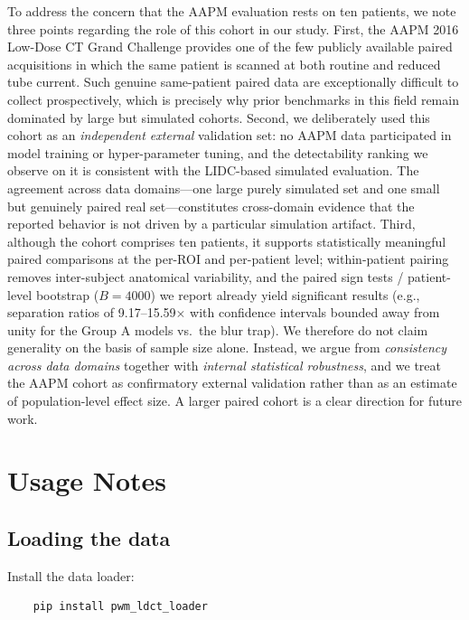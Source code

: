 \documentclass[twoside,11pt]{article}
\begin{document}
To address the concern that the AAPM evaluation rests on ten patients, we note three points regarding the role of this cohort in our study. First, the AAPM 2016 Low-Dose CT Grand Challenge provides one of the few publicly available paired acquisitions in which the same patient is scanned at both routine and reduced tube current. Such genuine same-patient paired data are exceptionally difficult to collect prospectively, which is precisely why prior benchmarks in this field remain dominated by large but simulated cohorts. Second, we deliberately used this cohort as an \emph{independent external} validation set: no AAPM data participated in model training or hyper-parameter tuning, and the detectability ranking we observe on it is consistent with the LIDC-based simulated evaluation. The agreement across data domains---one large purely simulated set and one small but genuinely paired real set---constitutes cross-domain evidence that the reported behavior is not driven by a particular simulation artifact. Third, although the cohort comprises ten patients, it supports statistically meaningful paired comparisons at the per-ROI and per-patient level; within-patient pairing removes inter-subject anatomical variability, and the paired sign tests / patient-level bootstrap ($B = 4000$) we report already yield significant results (e.g., separation ratios of 9.17--15.59$\times$ with confidence intervals bounded away from unity for the Group A models vs.\ the blur trap). We therefore do not claim generality on the basis of sample size alone. Instead, we argue from \emph{consistency across data domains} together with \emph{internal statistical robustness}, and we treat the AAPM cohort as confirmatory external validation rather than as an estimate of population-level effect size. A larger paired cohort is a clear direction for future work.

\section*{Usage Notes}

\subsection*{Loading the data}

Install the data loader:
\begin{verbatim}
    pip install pwm_ldct_loader
\end{verbatim}
\end{document}
